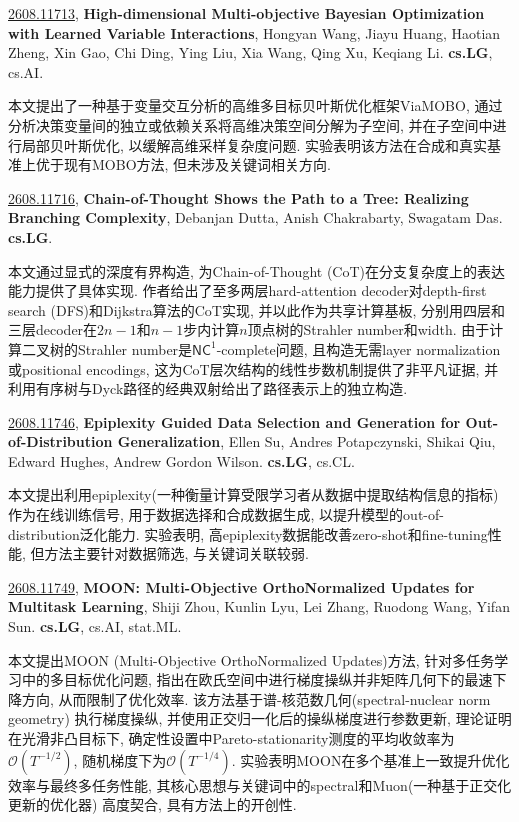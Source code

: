 \documentclass[9pt, a4paper]{article}
\theoremstyle{plain}
\theoremstyle{definition}
\theoremstyle{remark}
\newcommand{\arxivwithtarget}[3]{\hypertarget{#1}{}\href{https://arxiv.org/abs/#1}{#1}, \textbf{\textcolor{arxivblue}{#2}}, #3. }
\begin{document}
\arxivwithtarget{2608.11713}{High-dimensional Multi-objective Bayesian Optimization with Learned Variable Interactions}{Hongyan Wang, Jiayu Huang, Haotian Zheng, Xin Gao, Chi Ding, Ying Liu, Xia Wang, Qing Xu, Keqiang Li}\textbf{cs.LG}, cs.AI.

本文提出了一种基于变量交互分析的高维多目标贝叶斯优化框架ViaMOBO, 通过分析决策变量间的独立或依赖关系将高维决策空间分解为子空间, 并在子空间中进行局部贝叶斯优化, 以缓解高维采样复杂度问题. 实验表明该方法在合成和真实基准上优于现有MOBO方法, 但未涉及关键词相关方向.


\arxivwithtarget{2608.11716}{Chain-of-Thought Shows the Path to a Tree: Realizing Branching Complexity}{Debanjan Dutta, Anish Chakrabarty, Swagatam Das}\textbf{cs.LG}.

本文通过显式的深度有界构造, 为Chain-of-Thought (CoT)在分支复杂度上的表达能力提供了具体实现. 作者给出了至多两层hard-attention decoder对depth-first search (DFS)和Dijkstra算法的CoT实现, 并以此作为共享计算基板, 分别用四层和三层decoder在$2n-1$和$n-1$步内计算$n$顶点树的Strahler number和width. 由于计算二叉树的Strahler number是$\textsf{NC}^1$-complete问题, 且构造无需layer normalization或positional encodings, 这为CoT层次结构的线性步数机制提供了非平凡证据, 并利用有序树与Dyck路径的经典双射给出了路径表示上的独立构造.


\arxivwithtarget{2608.11746}{Epiplexity Guided Data Selection and Generation for Out-of-Distribution Generalization}{Ellen Su, Andres Potapczynski, Shikai Qiu, Edward Hughes, Andrew Gordon Wilson}\textbf{cs.LG}, cs.CL.

本文提出利用epiplexity(一种衡量计算受限学习者从数据中提取结构信息的指标) 作为在线训练信号, 用于数据选择和合成数据生成, 以提升模型的out-of-distribution泛化能力. 实验表明, 高epiplexity数据能改善zero-shot和fine-tuning性能, 但方法主要针对数据筛选, 与关键词关联较弱.


\arxivwithtarget{2608.11749}{MOON: Multi-Objective OrthoNormalized Updates for Multitask Learning}{Shiji Zhou, Kunlin Lyu, Lei Zhang, Ruodong Wang, Yifan Sun}\textbf{cs.LG}, cs.AI, stat.ML.

本文提出MOON (Multi-Objective OrthoNormalized Updates)方法, 针对多任务学习中的多目标优化问题, 指出在欧氏空间中进行梯度操纵并非矩阵几何下的最速下降方向, 从而限制了优化效率. 该方法基于谱-核范数几何(spectral-nuclear norm geometry) 执行梯度操纵, 并使用正交归一化后的操纵梯度进行参数更新, 理论证明在光滑非凸目标下, 确定性设置中Pareto-stationarity测度的平均收敛率为$\mathcal{O}(T^{-1/2})$, 随机梯度下为$\mathcal{O}(T^{-1/4})$. 实验表明MOON在多个基准上一致提升优化效率与最终多任务性能, 其核心思想与关键词中的spectral和Muon(一种基于正交化更新的优化器) 高度契合, 具有方法上的开创性.
\end{document}
